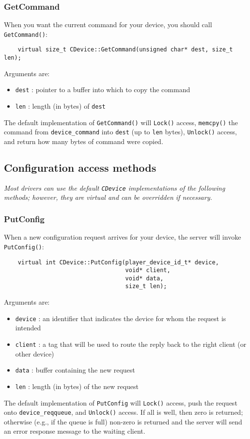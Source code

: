 \documentclass[11pt]{report}
\begin{document}
\subsubsection{GetCommand}
When you want the current command for your device, you should call 
{\tt GetCommand()}:
\begin{verbatim}
    virtual size_t CDevice::GetCommand(unsigned char* dest, size_t len);
\end{verbatim}
Arguments are:
\begin{itemize}
\item {\tt dest} : pointer to a buffer into which to copy the command
\item {\tt len} : length (in bytes) of {\tt dest}
\end{itemize}
The default implementation of {\tt GetCommand()} will {\tt Lock()} access, 
{\tt memcpy()} the command from {\tt device\_command} into {\tt dest} 
(up to {\tt len} bytes), {\tt Unlock()} access, and return how many bytes of 
command were copied.

\subsection{Configuration access methods}
{\em Most drivers can use the default {\tt CDevice} implementations of the
following methods; however, they are virtual and can be overridden if
necessary.}

\subsubsection{PutConfig}
When a new configuration request arrives for your device, the server will
invoke {\tt PutConfig()}:
\begin{verbatim}
    virtual int CDevice::PutConfig(player_device_id_t* device, 
                                   void* client, 
                                   void* data,
                                   size_t len);
\end{verbatim}
Arguments are:
\begin{itemize}
\item {\tt device} : an identifier that indicates the device for whom the
request is intended
\item {\tt client} : a tag that will be used to route the reply back to the
right client (or other device)
\item {\tt data} : buffer containing the new request
\item {\tt len} : length (in bytes) of the new request
\end{itemize}
The default implementation of {\tt PutConfig} will {\tt Lock()} access, 
push the request onto {\tt device\_reqqueue}, and {\tt Unlock()} access.  If
all is well, then zero is returned; otherwise (e.g., if the queue is full)
non-zero is returned and the server will send an error response message to the
waiting client.
\end{document}
